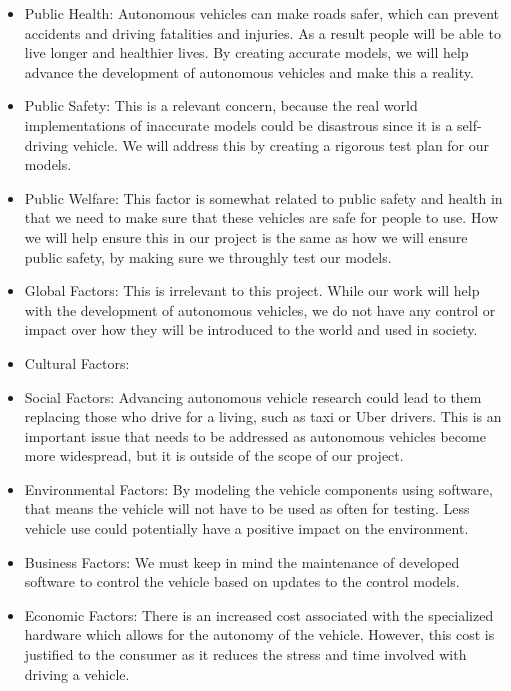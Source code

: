 \documentclass[12pt]{article} %
\begin{document}
\begin{itemize}
    \item Public Health: Autonomous vehicles can make roads safer, which can prevent accidents and driving fatalities and injuries. As a result people will be able to live longer and healthier lives. By creating accurate models, we will help advance the development of autonomous vehicles and make this a reality. 
    \item Public Safety: This is a relevant concern, because the real world implementations of inaccurate models could be disastrous since it is a self-driving vehicle. We will address this by creating a rigorous test plan for our models. 
    \item Public Welfare: This factor is somewhat related to public safety and health in that we need to make sure that these vehicles are safe for people to use. How we will help ensure this in our project is the same as how we will ensure public safety, by making sure we throughly test our models. 
    \item Global Factors: This is irrelevant to this project. While our work will help with the development of autonomous vehicles, we do not have any control or impact over how they will be introduced to the world and used in society. 
    \item Cultural Factors: 
    \item Social Factors: Advancing autonomous vehicle research could lead to them replacing those who drive for a living, such as taxi or Uber drivers. This is an important issue that needs to be addressed as autonomous vehicles become more widespread, but it is outside of the scope of our project. 
    \item Environmental Factors: By modeling the vehicle components using software, that means the vehicle will not have to be used as often for testing. Less vehicle use could potentially have a positive impact on the environment. 
    \item Business Factors: We must keep in mind the maintenance of developed software to control the vehicle based on updates to the control models. 
    \item Economic Factors: There is an increased cost associated with the specialized hardware which allows for the autonomy of the vehicle. However, this cost is justified to the consumer as it reduces the stress and time involved with driving a vehicle. 

\end{itemize}

\pagebreak


\end{document}
